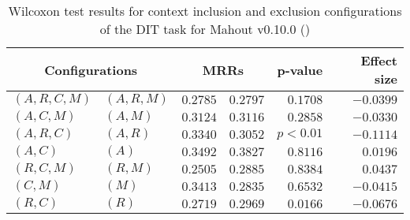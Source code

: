 
\begin{table}
\begin{spacing}{1.2}
\centering
\caption{Wilcoxon test results for context inclusion and exclusion configurations of the DIT task for Mahout v0.10.0 (\ctwo)}
\label{table:versus-wilcox-mahout-dit-context}
\begin{tabular}{ll|rr|rr}
\toprule
      \multicolumn{2}{c|}{Configurations} &                \multicolumn{2}{c|}{MRRs} &             p-value & Effect size \\
\midrule
 $(A,R,C,M)$ &  $(A,R,M)$ &       $0.2785$ &  $\bm{0.2797}$ & $0.1708$ &   $-0.0399$ \\
   $(A,C,M)$ &    $(A,M)$ &  $\bm{0.3124}$ &       $0.3116$ & $0.2858$ &   $-0.0330$ \\
   $(A,R,C)$ &    $(A,R)$ &  $\bm{0.3340}$ &       $0.3052$ & $p<0.01$ &   $-0.1114$ \\
     $(A,C)$ &      $(A)$ &       $0.3492$ &  $\bm{0.3827}$ & $0.8116$ &    $0.0196$ \\
   $(R,C,M)$ &    $(R,M)$ &       $0.2505$ &  $\bm{0.2885}$ & $0.8384$ &    $0.0437$ \\
     $(C,M)$ &      $(M)$ &  $\bm{0.3413}$ &       $0.2835$ & $0.6532$ &   $-0.0415$ \\
     $(R,C)$ &      $(R)$ &       $0.2719$ &  $\bm{0.2969}$ & $0.0166$ &   $-0.0676$ \\
\bottomrule
\end{tabular}

\end{spacing}
\end{table}

